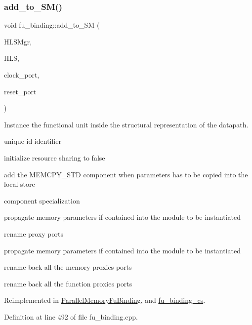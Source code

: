 \subsubsection{\texorpdfstring{add\+\_\+to\+\_\+\+S\+M()}{add\_to\_SM()}}
{\footnotesize\ttfamily void fu\+\_\+binding\+::add\+\_\+to\+\_\+\+SM (\begin{DoxyParamCaption}\item[{const \hyperlink{hls__manager_8hpp_acd3842b8589fe52c08fc0b2fcc813bfe}{H\+L\+S\+\_\+manager\+Ref}}]{H\+L\+S\+Mgr,  }\item[{const \hyperlink{hls_8hpp_a75d0c73923d0ddfa28c4843a802c73a7}{hls\+Ref}}]{H\+LS,  }\item[{\hyperlink{structural__objects_8hpp_a8ea5f8cc50ab8f4c31e2751074ff60b2}{structural\+\_\+object\+Ref}}]{clock\+\_\+port,  }\item[{\hyperlink{structural__objects_8hpp_a8ea5f8cc50ab8f4c31e2751074ff60b2}{structural\+\_\+object\+Ref}}]{reset\+\_\+port }\end{DoxyParamCaption})\hspace{0.3cm}{\ttfamily [virtual]}}



Instance the functional unit inside the structural representation of the datapath. 

unique id identifier

initialize resource sharing to false

add the M\+E\+M\+C\+P\+Y\+\_\+\+S\+TD component when parameters has to be copied into the local store

component specialization

propagate memory parameters if contained into the module to be instantiated

rename proxy ports

propagate memory parameters if contained into the module to be instantiated

rename back all the memory proxies ports

rename back all the function proxies ports 

Reimplemented in \hyperlink{classParallelMemoryFuBinding_a63fd8380e73d6b06e4c4249a07d54aa8}{Parallel\+Memory\+Fu\+Binding}, and \hyperlink{classfu__binding__cs_a60affd4760275bc386a0bdc05400dc6b}{fu\+\_\+binding\+\_\+cs}.



Definition at line 492 of file fu\+\_\+binding.\+cpp.



